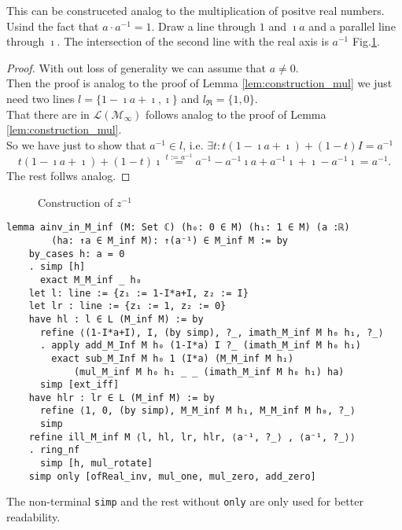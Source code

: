 This can be construceted analog to the multiplication of positve real numbers. Usind the fact that $a\cdot a^{-1} = 1$. Draw a line through $1$ and $\imath a$ and a parallel line through $\imath$. The intersection of the second line with the real axis is $a^{-1}$ Fig.\ref{Fig.6}.
\begin{proof}
    With  out loss of generality we can assume that $a \ne 0$.\\
    Then the proof is analog to the proof of Lemma \ref{lem:construction_mul} we just need two lines $l = \{1-\imath a + \imath, \imath\}$ and $l_{\Re} = \{1,0\}$.\\
    That there are in $\mathcal{L(M_{\infty})}$ follows analog to the proof of Lemma \ref{lem:construction_mul}.\\ 
    So we have just to show that $a^{-1} \in l$, i.e. $\exists t: t  (1 - \imath a + \imath) + (1 - t)  I = a^{-1}$ $$t  (1 - \imath a + \imath) + (1 - t)  \imath \stackrel{t:=a^{-1}}{=}  a^{-1} - a^{-1} \imath a + a^{-1}\imath + \imath - a^{-1}\imath = a^{-1}.$$
    The rest follws analog.
\end{proof}
\begin{figure}[h!]
    \centering
    \caption{Construction of $z^{-1}$}
    \label{Fig.6}
\end{figure}

\begin{lstlisting}
lemma ainv_in_M_inf (M: Set ℂ) (h₀: 0 ∈ M) (h₁: 1 ∈ M) (a :ℝ) 
        (ha: ↑a ∈ M_inf M): ↑(a⁻¹) ∈ M_inf M := by
    by_cases h: a = 0
    . simp [h]
      exact M_M_inf _ h₀
    let l: line := {z₁ := 1-I*a+I, z₂ := I}
    let lr : line := {z₁ := 1, z₂ := 0}
    have hl : l ∈ L (M_inf M) := by
      refine ⟨(1-I*a+I), I, (by simp), ?_, imath_M_inf M h₀ h₁, ?_⟩
      . apply add_M_Inf M h₀ (1-I*a) I ?_ (imath_M_inf M h₀ h₁)
        exact sub_M_Inf M h₀ 1 (I*a) (M_M_inf M h₁) 
            (mul_M_inf M h₀ h₁ _ _ (imath_M_inf M h₀ h₁) ha)
      simp [ext_iff]
    have hlr : lr ∈ L (M_inf M) := by
      refine ⟨1, 0, (by simp), M_M_inf M h₁, M_M_inf M h₀, ?_⟩
      simp
    refine ill_M_inf M ⟨l, hl, lr, hlr, ⟨a⁻¹, ?_⟩ , ⟨a⁻¹, ?_⟩⟩
    . ring_nf
      simp [h, mul_rotate]
    simp only [ofReal_inv, mul_one, mul_zero, add_zero]
\end{lstlisting}
\begin{remark}
    The non-terminal \verb|simp| and the rest without \verb|only| are only used for better readability.
\end{remark}

